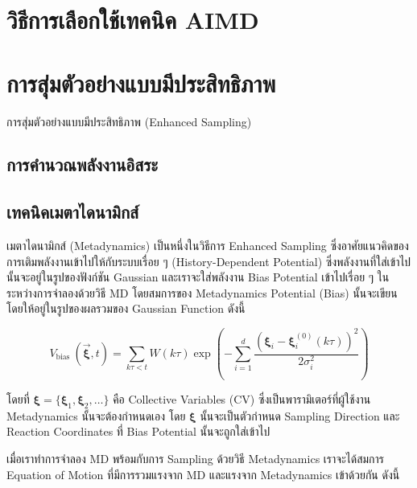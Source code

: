 \section{วิธีการเลือกใช้เทคนิค AIMD}

\section{การสุ่มตัวอย่างแบบมีประสิทธิภาพ}

การสุ่มตัวอย่างแบบมีประสิทธิภาพ (Enhanced Sampling)

\subsection{การคำนวณพลังงานอิสระ}

\subsection{เทคนิคเมตาไดนามิกส์}

เมตาไดนามิกส์ (Metadynamics) เป็นหนึ่งในวิธีการ Enhanced Sampling ซึ่งอาศัยแนวคิดของการเติมพลังงานเข้าไปให้กับระบบเรื่อย ๆ
(History-Dependent Potential) ซึ่งพลังงานที่ใส่เข้าไปนั้นจะอยู่ในรูปของฟังก์ชัน Gaussian และเราจะใส่พลังงาน Bias Potential
เข้าไปเรื่อย ๆ ในระหว่างการจำลองด้วยวิธี MD โดยสมการของ Metadynamics Potential (Bias) นั้นจะเขียนโดยให้อยู่ในรูปของผลรวมของ
Gaussian Function ดังนี้

\begin{equation}
  V_{\text{bias }}(\vec{\boldsymbol{\xi}},t)
  =
  \sum_{ k \tau < t} W(k \tau)
  \exp\left( -\sum_{i=1}^{d} \frac{(\boldsymbol{\xi}_i - \boldsymbol{\xi}_i^{(0)}(k \tau))^2}{2\sigma_i^2} \right)
\end{equation}

\noindent โดยที่ $\boldsymbol{\xi} = \{\boldsymbol{\xi}_{1}, \boldsymbol{\xi}_{2}, \dots\}$ คือ Collective Variables
(CV) ซึ่งเป็นพารามิเตอร์ที่ผู้ใช้งาน Metadynamics นั้นจะต้องกำหนดเอง โดย $\boldsymbol{\xi}$ นั้นจะเป็นตัวกำหนด Sampling Direction
และ Reaction Coordinates ที่ Bias Potential นั้นจะถูกใส่เข้าไป

เมื่อเราทำการจำลอง MD พร้อมกับการ Sampling ด้วยวิธี Metadynamics เราจะได้สมการ Equation of Motion ที่มีการรวมแรงจาก MD
และแรงจาก Metadynamics เข้าด้วยกัน ดังนี้

